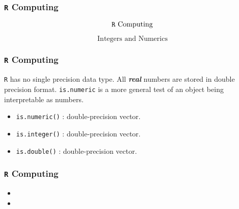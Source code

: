 \documentclass{beamer}
\begin{document}
\begin{frame}
\frametitle{\texttt{R} Computing}
{
\Huge
\[ \mbox{ \texttt{R} Computing }\]
}

{
\Large
\[ \mbox{ Integers and Numerics }\]
}



\end{frame}
\begin{frame}
\frametitle{\texttt{R} Computing}
\texttt{R} has no single precision data type. All \textit{\textbf{real}} numbers are stored in double precision format.
\texttt{is.numeric} is a more general test of an object being interpretable as numbers.
\begin{itemize}
\item \texttt{is.numeric()} : double-precision vector.
\item \texttt{is.integer()} : double-precision vector.
\item \texttt{is.double()} : double-precision vector.
\end{itemize}

\end{frame}

\begin{frame}
\frametitle{\texttt{R} Computing}
\begin{itemize}
\item
\item
\end{itemize}
\end{frame}
\end{document}
